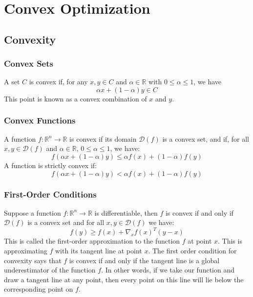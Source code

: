 \documentclass[twoside,twocolumn]{article}
\begin{document}
\section{Convex Optimization}
\subsection{Convexity}
\subsubsection{Convex Sets}
A set $C$ is convex if, for any $x,y \in C$ and $\alpha \in \mathbb{R}$ with
$0 \leq \alpha \leq 1$, we have
\begin{equation}
  \alpha x + (1-\alpha) y \in C
\end{equation}
This point is known as a convex combination of $x$ and $y$.
\subsubsection{Convex Functions}
A function
$f: \mathbb{R}^n \to \mathbb{R}$ is convex if its domain $\mathcal{D}(f)$ is
a convex set, and if, for all $x, y \in \mathcal{D}(f)$ and
$\alpha \in \mathbb{R}$, $0 \leq \alpha \leq 1$, we have:
\begin{equation}
  f(\alpha x + (1-\alpha) y) \leq \alpha f(x) + (1-\alpha) f(y)
\end{equation}
A function is strictly convex if:
\begin{equation}
  f(\alpha x + (1-\alpha) y) < \alpha f(x) + (1-\alpha) f(y)
\end{equation}
\subsubsection{First-Order Conditions}
Suppose a function $f: \mathbb{R}^n \to \mathbb{R}$ is differentiable, then
$f$ is convex if and only if $\mathcal{D}(f)$ is a convex set and for all
$x, y \in \mathcal{D}(f)$ we have:
\begin{equation}
  f(y) \geq f(x) + \nabla_xf(x)^T(y-x)
\end{equation}
This is called the first-order approximation to the function $f$ at point $x$.
This is approximating $f$ with its tangent line at point $x$.
The first order condition for convexity says that $f$ is convex if and only if
the tangent line is a global underestimator of the function $f$.
In other words, if we take our function and draw a tangent line at any point,
then every point on this line will lie below the corresponding point on $f$.
\end{document}
